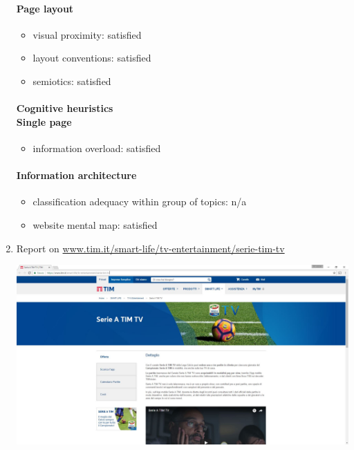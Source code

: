 \begin{enumerate}
	\paragraph*{Page layout}
	\begin{itemize}
		\item visual proximity: satisfied
		\item layout conventions: satisfied
		\item semiotics: satisfied
	\end{itemize}	
	
	\paragraph*{Cognitive heuristics \\ Single page}
	\begin{itemize}
		\item information overload: satisfied
	\end{itemize}	
	
	\paragraph*{Information architecture}
	\begin{itemize}
		\item classification adequacy within group of topics: n/a
		\item website mental map: satisfied
	\end{itemize}


\item Report on \url{www.tim.it/smart-life/tv-entertainment/serie-tim-tv}

\begin{center}
	\includegraphics[width=\textwidth]{Screenshot/serieatimtv.jpg}
\end{center}
\vspace{1cm}


\end{enumerate}
